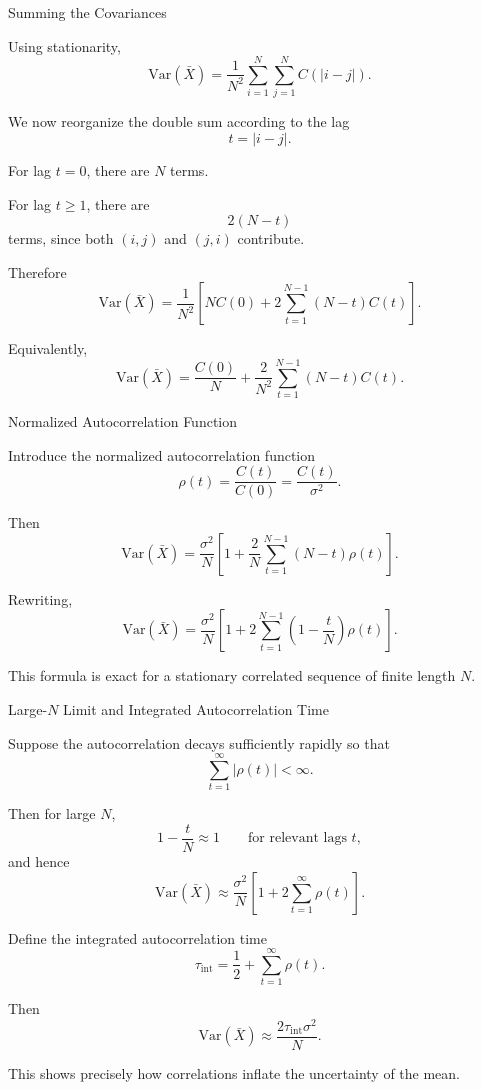 \documentclass{beamer}
\begin{document}
\begin{frame}{Summing the Covariances}

Using stationarity,
\[
\mathrm{Var}(\bar X)
=
\frac{1}{N^2}\sum_{i=1}^N\sum_{j=1}^N C(|i-j|).
\]

We now reorganize the double sum according to the lag
\[
t = |i-j|.
\]

For lag $t=0$, there are $N$ terms.

For lag $t\ge 1$, there are
\[
2(N-t)
\]
terms, since both $(i,j)$ and $(j,i)$ contribute.

Therefore
\[
\mathrm{Var}(\bar X)
=
\frac{1}{N^2}
\left[
N C(0) + 2\sum_{t=1}^{N-1}(N-t)C(t)
\right].
\]

Equivalently,
\[
\mathrm{Var}(\bar X)
=
\frac{C(0)}{N}
+
\frac{2}{N^2}\sum_{t=1}^{N-1}(N-t)C(t).
\]
\end{frame}

\begin{frame}{Normalized Autocorrelation Function}

Introduce the normalized autocorrelation function
\[
\rho(t)=\frac{C(t)}{C(0)}=\frac{C(t)}{\sigma^2}.
\]

Then
\[
\mathrm{Var}(\bar X)
=
\frac{\sigma^2}{N}
\left[
1+\frac{2}{N}\sum_{t=1}^{N-1}(N-t)\rho(t)
\right].
\]

Rewriting,
\[
\mathrm{Var}(\bar X)
=
\frac{\sigma^2}{N}
\left[
1+2\sum_{t=1}^{N-1}\left(1-\frac{t}{N}\right)\rho(t)
\right].
\]

This formula is exact for a stationary correlated sequence of finite length $N$.
\end{frame}

\begin{frame}{Large-$N$ Limit and Integrated Autocorrelation Time}

Suppose the autocorrelation decays sufficiently rapidly so that
\[
\sum_{t=1}^{\infty} |\rho(t)| < \infty.
\]

Then for large $N$,
\[
1-\frac{t}{N}\approx 1
\qquad
\text{for relevant lags } t,
\]
and hence
\[
\mathrm{Var}(\bar X)
\approx
\frac{\sigma^2}{N}
\left[
1+2\sum_{t=1}^{\infty}\rho(t)
\right].
\]

Define the integrated autocorrelation time
\[
\tau_{\mathrm{int}}
=
\frac{1}{2}+\sum_{t=1}^{\infty}\rho(t).
\]

Then
\[
\mathrm{Var}(\bar X)
\approx
\frac{2\tau_{\mathrm{int}}\sigma^2}{N}.
\]

This shows precisely how correlations inflate the uncertainty of the mean.
\end{frame}
\end{document}

